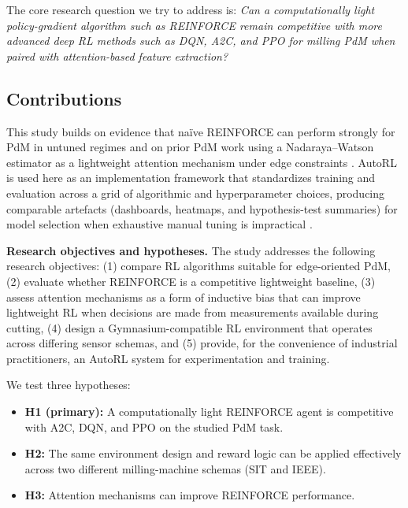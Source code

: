 \documentclass[sn-basic]{sn-jnl} %
\begin{document}
The core research question we try to address is: \emph{Can a computationally light policy-gradient algorithm such as \textsc{REINFORCE} remain competitive with more advanced deep RL methods such as \textsc{DQN}, \textsc{A2C}, and \textsc{PPO} for milling PdM when paired with attention-based feature extraction?}

\subsection{Contributions}

This study builds on evidence that na\"{i}ve \textsc{REINFORCE} can perform strongly for PdM in untuned regimes \cite{Siraskar2025} and on prior PdM work using a Nadaraya--Watson estimator as a lightweight attention mechanism under edge constraints \cite{Siraskar2024}. AutoRL is used here as an implementation framework that standardizes training and evaluation across a grid of algorithmic and hyperparameter choices, producing comparable artefacts (dashboards, heatmaps, and hypothesis-test summaries) for model selection when exhaustive manual tuning is impractical \cite{Schwartz2020, Strubell2019, Faust2019, Mussi2022}.

\textbf{Research objectives and hypotheses.}
The study addresses the following research objectives: (1) compare RL algorithms suitable for edge-oriented PdM, (2) evaluate whether \textsc{REINFORCE} is a competitive lightweight baseline, (3) assess attention mechanisms as a form of inductive bias that can improve lightweight RL when decisions are made from measurements available during cutting, (4) design a Gymnasium-compatible RL environment that operates across differing sensor schemas, and (5) provide, for the convenience of industrial practitioners, an AutoRL system for experimentation and training.

We test three hypotheses:
\begin{itemize}
        \item \textbf{H1 (primary):} A computationally light \textsc{REINFORCE} agent is competitive with \textsc{A2C}, \textsc{DQN}, and \textsc{PPO} on the studied PdM task.
        \item \textbf{H2:} The same environment design and reward logic can be applied effectively across two different milling-machine schemas (SIT and IEEE).
        \item \textbf{H3:} Attention mechanisms can improve \textsc{REINFORCE} performance.
\end{itemize}
\end{document}
